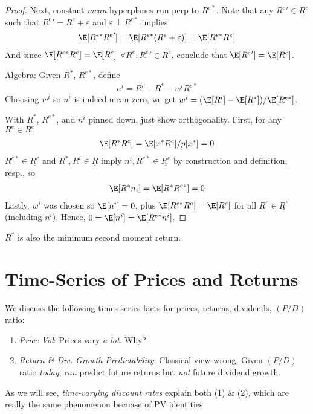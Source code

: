 \documentclass[12pt]{article}
\theoremstyle{plain}
\theoremstyle{definition}
\theoremstyle{remark}
\begin{document}
\begin{multicols*}{2}
\begin{proof}
Next, constant \emph{mean} hyperplanes run perp to $R^{e*}$.
Note that any ${R^{e}}'\in\underline{R^e}$ such that
${R^{e}}'=R^e+\varepsilon$ and $\varepsilon\perp R^{e*}$
implies
\begin{align*}
  \E[R^{e*}{R^{e}}']
  =
  \E[R^{e*}(R^{e}+\varepsilon)]
  = \E[R^{e*}R^e]
\end{align*}
And since $\E[R^{e*}R^e]=\E[R^e]$
$\forall R^e,{R^e}'\in\underline{R^e}$, conclude that
$\E[{R^{e}}']=\E[R^{e}]$.

Algebra:
Given $R^*$, $R^{e*}$, define
\begin{align*}
  n^i = R^i - R^* -w^i R^{e*}
\end{align*}
Choosing $w^i$ so $n^i$ is indeed mean zero, we get
$w^i = (\E[R^i] - \E[R^*])/\E[R^{e*}]$.

With $R^*$, $R^{e*}$, and $n^i$ pinned down, just show orthogonality.
First, for any $R^e\in\underline{R^e}$
\begin{align*}
  \E[R^*R^e]=\E[x^*R^e]/p[x^*]=0
\end{align*}
$R^{e*}\in\underline{R^e}$ and $R^*,R^i\in\underline{R}$
imply $n^i,R^{e*}\in\underline{R^e}$ by construction and definition,
resp., so
\begin{align*}
  \E[R^*n_i]=\E[R^*R^{e*}]=0
\end{align*}
Lastly, $w^i$ was chosen so $\E[n^i]=0$, plus
$\E[R^{e*}R^e]=\E[R^e]$ for all $R^e\in\underline{R^e}$ (including
$n^i$). Hence, $0=\E[n^i] =\E[R^{e*}n^i]$.
\end{proof}

\clearpage
$R^*$ is also the minimum second moment return.


\clearpage
\section{Time-Series of Prices and Returns}

We discuss the following times-series facts for prices,
returns, dividends, $(P/D)$ ratio:
\begin{enumerate}
  \item \emph{Price Vol}: Prices vary \emph{a lot}. Why?
  \item \emph{Return \& Div. Growth Predictability}:
    Classical view wrong.
    Given $(P/D)$ ratio \emph{today}, \emph{can} predict
    future returns but \emph{not} future dividend growth.
\end{enumerate}
As we will see, \emph{time-varying discount rates} explain both (1) \&
(2), which are really the same phenomenon becuase of PV identities


\end{multicols*}
\end{document}

